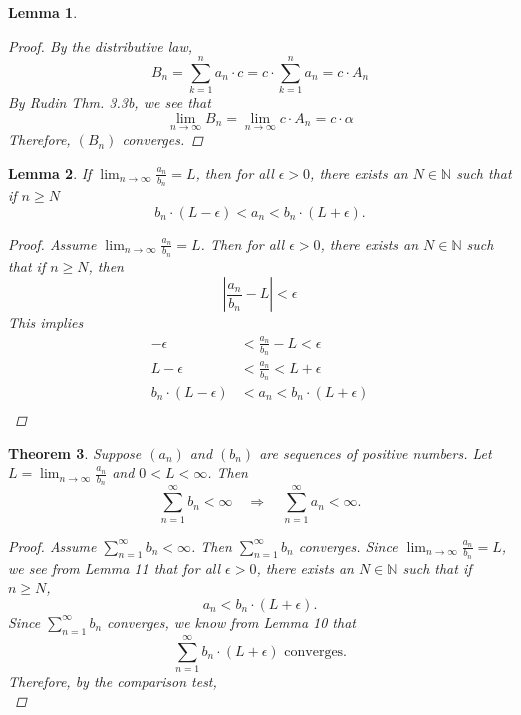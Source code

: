 \documentclass{amsart}
\newtheorem{theorem}{Theorem}
\newtheorem{lemma}[theorem]{Lemma}
\begin{document}
\begin{enumerate}[1.]
\begin{lemma}
\begin{proof}
        By the distributive law,
        \[
            B_n = \sum_{k=1}^n a_n\cdot c = c\cdot\sum_{k=1}^n a_n = c\cdot A_n
        \]
        By Rudin Thm. 3.3b, we see that 
        \[
            \lim_{n\to\infty} B_n = \lim_{n\to\infty} c\cdot A_n = c\cdot\alpha    
        \]
        Therefore, $(B_n)$ converges.
    \end{proof}
\end{lemma}
\begin{lemma}
    If $\displaystyle \lim_{n \to \infty} \frac{a_n}{b_n} = L$, then for all $\epsilon > 0$, there exists an $N\in\mathbb{N}$
    such that if $n \geq N$
    \[
        b_n \cdot(L - \epsilon) < a_n < b_n\cdot(L + \epsilon). 
    \]
    \begin{proof}
        Assume $\displaystyle \lim_{n \to \infty} \frac{a_n}{b_n} = L$. Then for all $\epsilon > 0$, there exists an $N \in \mathbb{N}$
        such that if $n \geq N$, then
        \[
            \left| \frac{a_n}{b_n} - L \right| < \epsilon    
        \]
        This implies
        \begin{align*}
            -\epsilon &< \frac{a_n}{b_n} - L < \epsilon \\
            L - \epsilon &< \frac{a_n}{b_n} < L + \epsilon \\
            b_n \cdot (L - \epsilon) &< a_n < b_n \cdot (L + \epsilon) \\
        \end{align*}
    \end{proof}
\end{lemma}
\begin{theorem}
    Suppose $(a_n)$ and $(b_n)$ are sequences of positive numbers. Let $\displaystyle L= \lim_{n\to\infty}\frac{a_n}{b_n}$ and $0 < L < \infty$.
    Then 
    \[ \sum_{n=1}^{\infty} b_n < \infty \quad \Rightarrow \quad \sum_{n=1}^{\infty} a_n < \infty.\]
    \begin{proof}
        Assume $\displaystyle \sum_{n=1}^{\infty} b_n < \infty$. Then $\displaystyle \sum_{n=1}^{\infty} b_n$ converges.
        Since $\displaystyle \lim_{n \to \infty} \frac{a_n}{b_n} = L$, we see from Lemma 11 that for all $\epsilon > 0$, there
        exists an $N\in\mathbb{N}$ such that if $n \geq N$,
        \[
            a_n < b_n \cdot (L + \epsilon).  
        \]
        Since $\displaystyle \sum_{n=1}^{\infty} b_n$ converges, we know from Lemma 10 that
        \[
            \displaystyle \sum_{n=1}^{\infty} b_n \cdot (L + \epsilon) \text{ converges.}
        \]
        Therefore, by the comparison test,
        \[
\]
\end{proof}
\end{theorem}
\end{enumerate}
\end{document}
